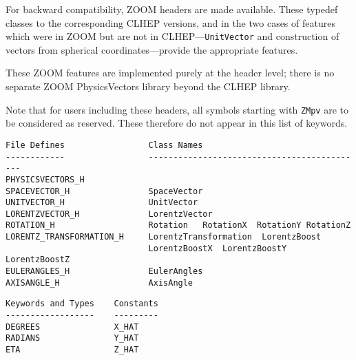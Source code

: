 For backward compatibility, ZOOM headers are made available.  
These typedef classes to the corresponding CLHEP versions, 
and in the two cases of features which were in ZOOM but are not in
CLHEP---{\tt UnitVector} and construction of vectors from 
spherical coordinates---provide the appropriate features.

These ZOOM features are implemented purely at the header level; there
is no separate ZOOM PhysicsVectors library beyond the CLHEP library.

Note that for users including these headers, all symbols starting with
{\tt ZMpv} are to be considered as reserved.  These therefore do not
appear in this list of keywords.

\begin{verbatim}
File Defines                 Class Names
------------                 --------------------------------------------
PHYSICSVECTORS_H 
SPACEVECTOR_H                SpaceVector 
UNITVECTOR_H                 UnitVector
LORENTZVECTOR_H              LorentzVector
ROTATION_H                   Rotation	RotationX  RotationY RotationZ
LORENTZ_TRANSFORMATION_H     LorentzTransformation  LorentzBoost 
                             LorentzBoostX  LorentzBoostY  LorentzBoostZ
EULERANGLES_H                EulerAngles
AXISANGLE_H                  AxisAngle
\end{verbatim}

\begin{verbatim}
Keywords and Types    Constants    
------------------    ---------    
DEGREES               X_HAT        
RADIANS               Y_HAT        
ETA                   Z_HAT        
\end{verbatim}


